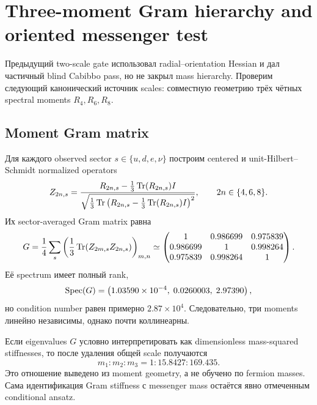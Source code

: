 \chapter{Three-moment Gram hierarchy and oriented messenger test}

Предыдущий two-scale gate использовал radial--orientation Hessian и дал
частичный blind Cabibbo pass, но не закрыл mass hierarchy. Проверим следующий
канонический источник scales: совместную геометрию трёх чётных spectral
moments $R_4,R_6,R_8$.

\section{Moment Gram matrix}

Для каждого observed sector $s\in\{u,d,e,\nu\}$ построим centered и
unit-Hilbert--Schmidt normalized operators
\begin{equation}
 Z_{2n,s}=\frac{R_{2n,s}-\frac13\operatorname{Tr}(R_{2n,s})I}
 {\sqrt{\frac13\operatorname{Tr}\left(R_{2n,s}-\frac13\operatorname{Tr}(R_{2n,s})I\right)^2}},
 \qquad 2n\in\{4,6,8\}.
\end{equation}
Их sector-averaged Gram matrix равна
\begin{equation}
 G=\frac14\sum_s\left(\frac13\operatorname{Tr}(Z_{2m,s}Z_{2n,s})\right)_{m,n}
 \simeq
 \begin{pmatrix}
 1&0.986699&0.975839\\
 0.986699&1&0.998264\\
 0.975839&0.998264&1
 \end{pmatrix}.
\end{equation}
Её spectrum имеет полный rank,
\begin{equation}
 \operatorname{Spec}(G)=
 \left(1.03590\times10^{-4},\;0.0260003,\;2.97390\right),
\end{equation}
но condition number равен примерно $2.87\times10^4$. Следовательно,
три moments линейно независимы, однако почти коллинеарны.

\begin{proposition}
Если eigenvalues $G$ условно интерпретировать как dimensionless
mass-squared stiffnesses, то после удаления общей scale получаются
\begin{equation}
 m_1:m_2:m_3=1:15.8427:169.435.
\end{equation}
Это отношение выведено из moment geometry, а не обучено по fermion masses.
Сама идентификация Gram stiffness с messenger mass остаётся явно отмеченным
conditional ansatz.
\end{proposition}

